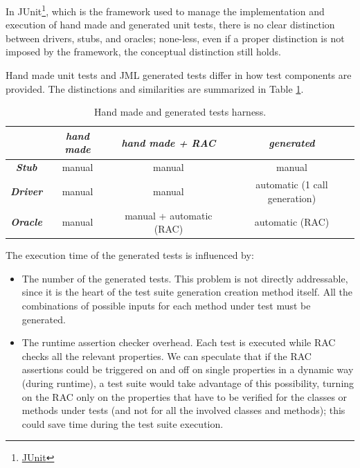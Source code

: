 \documentclass{article}
\newcommand{\myhref}[2]{\ifpdf\href{#1}{#2}\else\htmladdnormallinkfoot{#2}{#1}\fi}
\begin{document}
In JUnit\footnote{\myhref{http://www.junit.org/}{JUnit}}, which is the framework used to manage the implementation and execution of hand made and generated unit tests, there is no clear distinction between drivers, stubs, and oracles; none-less, even if a proper distinction
is not imposed by the framework, the conceptual distinction still holds.

Hand made unit tests and JML generated tests differ in how test components are provided.
The distinctions and similarities are summarized in Table \ref{tab:test_harness}.
\begin{table}[htbp]
  \caption{Hand made and generated tests harness.}
  \label{tab:test_harness}
  \begin{center}
    \begin{tabular}{|c|c|c|c|}\hline
       & \textbf{\textit{hand made}} & \textbf{\textit{hand made + RAC}} & \textbf{\textit{generated}} \\\hline
      \textbf{\textit{Stub}} & manual & manual & manual\\\hline
      \textbf{\textit{Driver}} & manual & manual & automatic (1 call generation)\\\hline
      \textbf{\textit{Oracle}} & manual & manual + automatic (RAC) & automatic (RAC)\\\hline
    \end{tabular}
  \end{center}
\end{table}

The execution time of the generated tests is influenced by:
\begin{itemize}
\item The number of the generated tests. 
This problem is not directly addressable, since it is the heart of the test suite generation creation method itself. 
All the combinations of possible inputs for each method under test must be generated.
\item The runtime assertion checker overhead. 
Each test is executed while RAC checks all the relevant properties. 
We can speculate that if the RAC assertions could be triggered on and off on single properties in a dynamic way (during runtime), a test suite would take advantage of this possibility, turning on the RAC only on the properties that have to be verified for the classes or methods under tests (and not for all the involved classes and methods); this could save time during the test suite execution.
\end{itemize}
\end{document}
